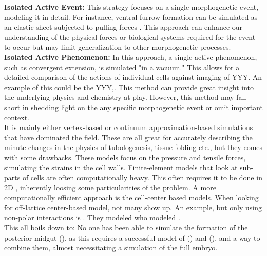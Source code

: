\textbf{Isolated Active Event:} This strategy focuses on a single morphogenetic event, modeling it in detail. For instance, ventral furrow formation can be simulated as an elastic sheet subjected to pulling forces . This approach can enhance our understanding of the physical forces or biological systems required for the event to occur but may limit generalization to other morphogenetic processes.\\

\textbf{Isolated Active Phenomenon:} In this approach, a single active phenomenon, such as convergent extension, is simulated "in a vacuum." This allows for a detailed comparison of the actions of individual cells against imaging of YYY. An example of this could be the YYY,.  This method can provide great insight into the underlying physics and chemistry at play. However, this method may fall short in shedding light on the any specific morphogenetic event or omit important context.\\

It is mainly either vertex-based or continuum approximation-based simulations that have dominated the field. These are all great for accurately describing the minute changes in the physics of tubologenesis, tissue-folding etc., but they comes with some drawbacks. These  models focus on the pressure and tensile forces, simulating the strains in the cell walls. Finite-element models that look at sub-parts of cells are often computationally heavy. This often requires it to be done in 2D \cite{krajnc2018fluidization}, inherently loosing some particularities of the problem. A more computationally efficient approach is the cell-center based models. When looking for off-lattice center-based model, not many show up. An example, but only using non-polar interactions is . They modeled who modeled .\\

This all boils down to: No one has been able to simulate the formation of the posterior midgut (), as this requires a successful model of () and (), and a way to combine them, almost necessitating a simulation of the full embryo.



% 


